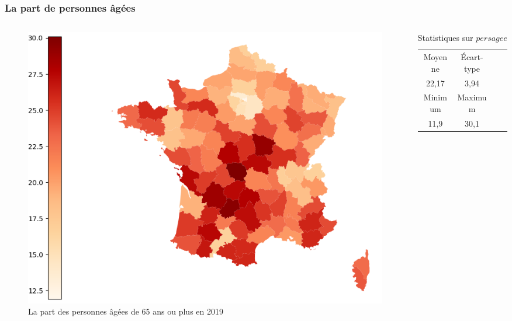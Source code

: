 \documentclass{beamer}
\begin{document}
\begin{frame}
    \frametitle{La part de personnes âgées}
    \begin{columns}
    \begin{column}{0.5\textwidth}
        \centering
        \begin{figure}
            \includegraphics[width=\textwidth]{persagee.png}
            \caption{La part des personnes âgées de 65 ans ou plus en 2019}
        \end{figure}
    \end{column}
    
    \begin{column}{0.5\textwidth}
    \begin{table}[H]
        \caption*{Statistiques sur $persagee$}
        \begin{tabular}{cccc}
        \toprule
        Moyenne  & Écart-type   \\ 
        22,17 &  3,94   \\
        \midrule
        Minimum & Maximum   \\ 
        11,9    & 30,1      \\
        \bottomrule
        \end{tabular}
    \end{table}
    \end{column}
    
    \end{columns}
\end{frame}
\end{document}
